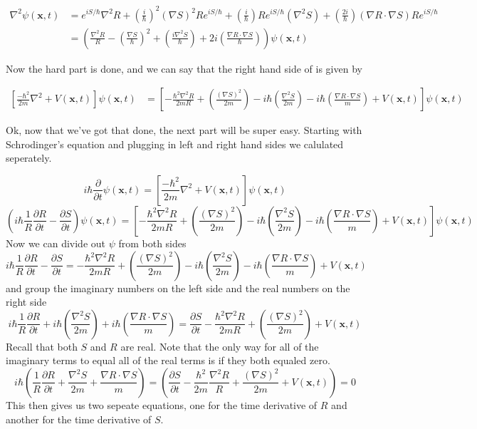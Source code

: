 $$
\begin{align*}
\nabla^2 \psi(\mathbf{x},t)  &= e^{i S / \hbar} \nabla^2 R + \left(\frac{i}{\hbar}\right)^2 (\nabla S)^2 R e^{i S / \hbar} + \left(\frac{i}{\hbar}\right) R e^{i S / \hbar} (\nabla^2 S) + \left(\frac{2i}{\hbar}\right) (\nabla R \cdot \nabla S) R e^{i S / \hbar}
\\ &= \left(\frac{\nabla^2 R}{R} - \left(\frac{\nabla S}{\hbar}\right)^2  + \left(\frac{i \nabla^2 S}{\hbar}\right) + 2 i \left(\frac{\nabla R \cdot \nabla S}{\hbar}\right) \right) \psi(\mathbf{x},t) 
\end{align*}
$$

Now the hard part is done, and we can say that the right hand side of  is given by 

$$
\begin{align*} 
\left [ \frac{-\hbar^2}{2 m}\nabla^2 + V(\mathbf{x},t)\right ]\psi(\mathbf{x},t) &= \left [-\frac{\hbar^2  \nabla^2 R}{2 m R} + \left(\frac{(\nabla S)^2}{2 m}\right)  - i \hbar \left(\frac{\nabla^2 S}{2 m}\right) - i \hbar \left(\frac{\nabla R \cdot \nabla S}{m}\right) + V(\mathbf{x},t) \right]\psi(\mathbf{x},t) 
\end{align*}
$$

Ok, now that we've got that done, the next part will be super easy. Starting with Schrodinger's equation and plugging in left and right hand sides we calulated seperately. 

$$
i\hbar\frac{\partial}{\partial t} \psi(\mathbf{x},t) = \left [ \frac{-\hbar^2}{2 m}\nabla^2 + V(\mathbf{x},t)\right ] \psi(\mathbf{x},t)
$$
$$
\left(i \hbar \frac{1}{R} \frac{\partial R}{\partial t} - \frac{\partial S}{\partial t}\right) \psi(\mathbf{x},t) =\left [-\frac{\hbar^2  \nabla^2 R}{2 m R} + \left(\frac{(\nabla S)^2}{2 m}\right)  - i \hbar \left(\frac{\nabla^2 S}{2 m}\right) - i \hbar \left(\frac{\nabla R \cdot \nabla S}{m}\right) + V(\mathbf{x},t) \right]\psi(\mathbf{x},t) 
$$
Now we can divide out $\psi$ from both sides
$$ 
i \hbar \frac{1}{R} \frac{\partial R}{\partial t} - \frac{\partial S}{\partial t} = -\frac{\hbar^2  \nabla^2 R}{2 m R} + \left(\frac{(\nabla S)^2}{2 m}\right)  - i \hbar \left(\frac{\nabla^2 S}{2 m}\right) - i \hbar \left(\frac{\nabla R \cdot \nabla S}{m}\right) + V(\mathbf{x},t)
$$
and group the imaginary numbers on the left side and the real numbers on the right side 
$$ i \hbar \frac{1}{R} \frac{\partial R}{\partial t} + i \hbar \left(\frac{\nabla^2 S}{2 m}\right) + i \hbar \left(\frac{\nabla R \cdot \nabla S}{m}\right) = \frac{\partial S}{\partial t} -\frac{\hbar^2  \nabla^2 R}{2 m R} + \left(\frac{(\nabla S)^2}{2 m}\right)  + V(\mathbf{x},t)
$$
Recall that both $S$ and $R$ are real. Note that the only way for all of the imaginary terms to equal all of the real terms is if they both equaled zero.
$$i \hbar \left(\frac{1}{R} \frac{\partial R}{\partial t} + \frac{\nabla^2 S}{2 m} + \frac{\nabla R \cdot \nabla S}{m}\right) = \left(\frac{\partial S}{\partial t} -\frac{\hbar^2}{2m}\frac{\nabla^2 R}{R} + \frac{(\nabla S)^2}{2 m}  + V(\mathbf{x},t) \right) = 0
$$
This then gives us two sepeate equations, one for the time derivative of $R$ and another for the time derivative of $S$.

